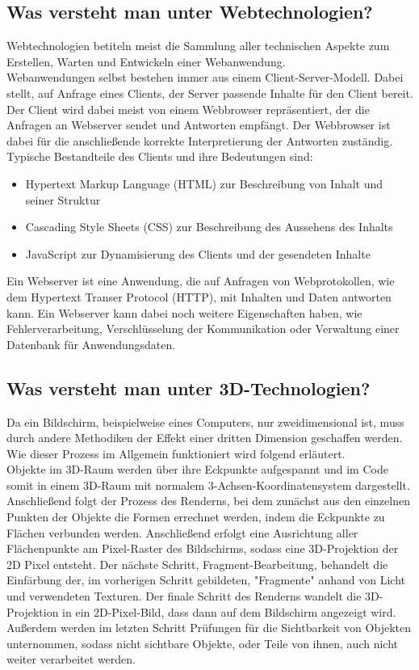 \subsection{Was versteht man unter Webtechnologien?}
Webtechnologien betiteln meist die Sammlung aller technischen Aspekte zum Erstellen, Warten und Entwickeln einer Webanwendung.\\
Webanwendungen selbst bestehen immer aus einem Client-Server-Modell. Dabei stellt, auf Anfrage eines Clients, der Server passende Inhalte für den Client bereit. Der Client wird dabei meist von einem Webbrowser repräsentiert, der die Anfragen an Webserver sendet und Antworten empfängt. Der Webbrowser ist dabei für die anschließende korrekte Interpretierung der Antworten zuständig.
Typische Bestandteile des Clients und ihre Bedeutungen sind: 
\begin{itemize}
	\item Hypertext Markup Language (HTML) zur Beschreibung von Inhalt und seiner Struktur
	\item Cascading Style Sheets (CSS) zur Beschreibung des Aussehens des Inhalts
	\item JavaScript zur Dynamisierung des Clients und der gesendeten Inhalte
\end{itemize}
Ein Webserver ist eine Anwendung, die auf Anfragen von Webprotokollen, wie dem Hypertext Transer Protocol (HTTP), mit Inhalten und Daten antworten kann. Ein Webserver kann dabei noch weitere Eigenschaften haben, wie Fehlerverarbeitung, Verschlüsselung der Kommunikation oder Verwaltung einer Datenbank für Anwendungsdaten.
\subsection{Was versteht man unter 3D-Technologien?}
Da ein Bildschirm, beispielweise eines Computers, nur zweidimensional ist, muss durch andere Methodiken der Effekt einer dritten Dimension geschaffen werden. Wie dieser Prozess im Allgemein funktioniert wird folgend erläutert.\\Objekte im 3D-Raum werden über ihre Eckpunkte aufgespannt und im Code somit in einem 3D-Raum mit normalem 3-Achsen-Koordinatensystem dargestellt. Anschließend folgt der Prozess des Renderns, bei dem zunächst aus den einzelnen Punkten der Objekte die Formen errechnet werden, indem die Eckpunkte zu Flächen verbunden werden. Anschließend erfolgt eine Ausrichtung aller Flächenpunkte am Pixel-Raster des Bildschirms, sodass eine 3D-Projektion der 2D Pixel entsteht. Der nächste Schritt, Fragment-Bearbeitung, behandelt die Einfärbung der, im vorherigen Schritt gebildeten, "Fragmente" anhand von Licht und verwendeten Texturen. Der finale Schritt des Renderns wandelt die 3D-Projektion in ein 2D-Pixel-Bild, dass dann auf dem Bildschirm angezeigt wird. Außerdem werden im letzten Schritt Prüfungen für die Sichtbarkeit von Objekten unternommen, sodass nicht sichtbare Objekte, oder Teile von ihnen, auch nicht weiter verarbeitet werden.


